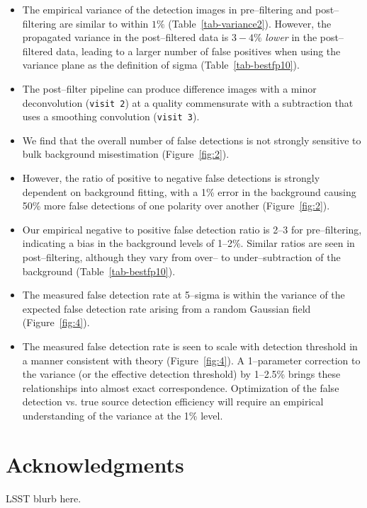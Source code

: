 \documentclass[floatfix, apj]{emulateapj}
\begin{document}
\begin{itemize}
\item The empirical variance of the detection images in pre--filtering and post--filtering are similar to within $1\%$ (Table~\ref{tab-variance2}).
  However, the propagated variance in the post--filtered data is $3-4\%$ {\it lower} in the post--filtered data, leading to a larger number of false positives when using the variance plane as the definition of sigma (Table~\ref{tab-bestfp10}).



\item The post--filter pipeline can produce difference images with a minor deconvolution ({\tt visit 2}) at a quality commensurate with a subtraction that uses a smoothing convolution ({\tt visit 3}).


\item We find that the overall number of false detections is not strongly sensitive to bulk background misestimation (Figure~\ref{fig:2}).

\item However, the ratio of positive to negative false detections is strongly dependent on background fitting, with a 1\% error in the background causing 50\% more false detections of one polarity over another (Figure~\ref{fig:2}).

\item Our empirical negative to positive false detection ratio is 2--3 for pre--filtering, indicating a bias in the background levels of 1--2\%.
  Similar ratios are seen in post--filtering, although they vary from over-- to under--subtraction of the background (Table~\ref{tab-bestfp10}).


\item The measured false detection rate at 5--sigma is within the variance of the expected false detection rate arising from a random Gaussian field (Figure~\ref{fig:4}).

\item The measured false detection rate is seen to scale with detection threshold in a manner consistent with theory (Figure~\ref{fig:4}).
  A 1--parameter correction to the variance (or the effective detection threshold) by 1--2.5\% brings these relationships into almost exact correspondence.
  Optimization of the false detection vs. true source detection efficiency will require an empirical understanding of the variance at the 1\% level.

\end{itemize}

\section*{Acknowledgments}
LSST blurb here.



\end{document}
